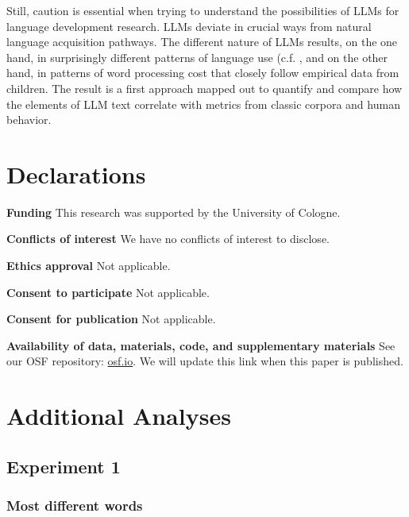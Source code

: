 \documentclass[doc, a4paper]{apa7}
\begin{document}
Still, caution is essential when trying to understand the possibilities of LLMs for language development research. LLMs deviate in crucial ways from natural language acquisition pathways. The different nature of LLMs results, on the one hand, in surprisingly different patterns of language use (c.f. \citep{vanmassenhove_machine_2021}, and on the other hand, in patterns of word processing cost that closely follow empirical data from children. The result is a first approach mapped out to quantify and compare how the elements of LLM text correlate with metrics from classic corpora and human behavior.


\section*{Declarations}

\textbf{Funding} This research was supported by the University of Cologne. 

\textbf{Conflicts of interest} We have no conflicts of interest to disclose. 

\textbf{Ethics approval} Not applicable. 

\textbf{Consent to participate} Not applicable. 

\textbf{Consent for publication} Not applicable. 

\textbf{Availability of data, materials, code, and supplementary materials} See our OSF repository: \href{https://osf.io/wmuvj/?view_only=06ba6b0ec23248df8a1418add4da05a0}{osf.io}. We will update this link when this paper is published. 



\newpage
 

\newpage

\appendix

\section{Additional Analyses}

\subsection{Experiment 1}

\subsubsection{Most different words}
\end{document}
